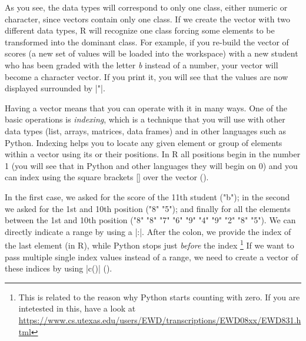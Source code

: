 
As you see, the data types will correspond to only one class, either
numeric or character, since vectors contain only one class. If we
create the vector with two different data types, R will recognize one
class forcing some elements to be transformed into the dominant
class. For example, if you re-build the vector of scores (a new set of
values will be loaded into the workspace) with a new student who has
been graded with the letter \emph{b} instead of a number, your vector
will become a character vector. If you print it, you will see that the
values are now displayed surrounded by |"|.


Having a vector means that you can operate with it in many ways. One of the
basic operations is \emph{indexing}, which is a technique that you will use with
other data types (list, arrays, matrices, data frames) and in other
languages such as Python.  Indexing helps you to locate any given
element or group of elements within a vector using its or their
positions. In R all positions begin in the number 1 (you will see that
in Python and other languages they will begin on 0) and you can index
using the square brackets [] over the vector ().


In the first case, we asked for the score of the 11th student ("b");
in the second we asked for the 1st and 10th position ("8" "5"); and
finally for all the elements between the 1st and 10th position ("8"
"8" "7" "6" "9" "4" "9" "2" "8" "5"). We can directly indicate a range
by using a |:|. After the colon, we provide the index of
the last element (in R), while Python stops just \emph{before} the index
\footnote{This is related to the
reason why Python starts counting with zero. If you are intetested
in this, have a look at \url{https://www.cs.utexas.edu/users/EWD/transcriptions/EWD08xx/EWD831.html}}
If we want to pass multiple single index values instead of a range,
we need to create a vector of these indices by using |c()| (). 

